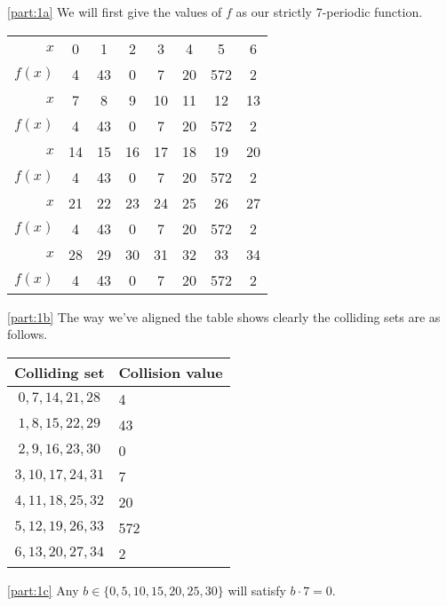 \documentclass[boxes,pages]{homework}
\begin{document}
\begin{solution}
	\ref{part:1a}
	We will first give the values of $f$ as our strictly 7-periodic function.
	\begin{center}
		\setlength{\tabcolsep}{10pt}
		\begin{tabular}{rccccccc}
			\centering
			$x$    & 0  & 1  & 2  & 3  & 4  & 5   & 6  \\
			$f(x)$ & 4  & 43 & 0  & 7  & 20 & 572 & 2  \\\midrule
			$x$    & 7  & 8  & 9  & 10 & 11 & 12  & 13 \\
			$f(x)$ & 4  & 43 & 0  & 7  & 20 & 572 & 2  \\\midrule
			$x$    & 14 & 15 & 16 & 17 & 18 & 19  & 20 \\
			$f(x)$ & 4  & 43 & 0  & 7  & 20 & 572 & 2  \\\midrule
			$x$    & 21 & 22 & 23 & 24 & 25 & 26  & 27 \\
			$f(x)$ & 4  & 43 & 0  & 7  & 20 & 572 & 2  \\\midrule
			$x$    & 28 & 29 & 30 & 31 & 32 & 33  & 34 \\
			$f(x)$ & 4  & 43 & 0  & 7  & 20 & 572 & 2
		\end{tabular}
	\end{center}

	\ref{part:1b}
	The way we've aligned the table shows clearly the colliding sets are as follows.
	\begin{center}
		\renewcommand{\arraystretch}{1.15}
		\begin{tabular}{cl}
			Colliding set       & Collision value \\\toprule
			$0, 7, 14, 21, 28$  & 4               \\
			$1, 8, 15, 22, 29$  & 43              \\
			$2, 9, 16, 23, 30$  & 0               \\
			$3, 10, 17, 24, 31$ & 7               \\
			$4, 11, 18, 25, 32$ & 20              \\
			$5, 12, 19, 26, 33$ & 572             \\
			$6, 13, 20, 27, 34$ & 2               \\
		\end{tabular}
	\end{center}

	\ref{part:1c}
	Any  $b\in\{0, 5, 10, 15, 20, 25, 30\}$ will satisfy $b\cdot 7 = 0$.

\end{solution}
\end{document}
